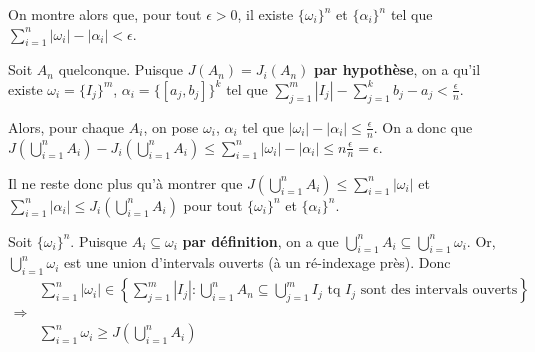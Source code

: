 \documentclass[a4paper,10pt]{article}
\begin{document}
On montre alors que, pour tout $\epsilon > 0$, il existe $\{\omega_i\}^n$ et $\{\alpha_i\}^n$ tel que $\sum_{i=1}^n |\omega_i| - |\alpha_i| < \epsilon$.

Soit $A_n$ quelconque. Puisque $J(A_n) = J_i(A_n)$ \textbf{par hypothèse}, on a qu'il existe $\omega_i = \{I_j\}^m$, $\alpha_i = \{[a_j, b_j]\}^k$ tel que $\sum_{j=1}^m |I_j| - \sum_{j=1}^k b_j - a_j < \frac{\epsilon}{n}$.

Alors, pour chaque $A_i$, on pose $\omega_i$, $\alpha_i$ tel que $|\omega_i| - |\alpha_i| \leq \frac{\epsilon}{n}$. On a donc que $J(\bigcup_{i=1}^n A_i) - J_i(\bigcup_{i=1}^n A_i) \leq \sum_{i=1}^n |\omega_i| - |\alpha_i| \leq n \frac{\epsilon}{n} = \epsilon$.

Il ne reste donc plus qu'à montrer que $J(\bigcup_{i=1}^n A_i) \leq \sum_{i=1}^n |\omega_i|$ et $\sum_{i=1}^n |\alpha_i| \leq J_i (\bigcup_{i=1}^n A_i)$ pour tout $\{\omega_i\}^n$ et $\{\alpha_i\}^n$.

Soit $\{\omega_i\}^n$. Puisque $A_i \subseteq \omega_i$ \textbf{par définition}, on a que $\bigcup_{i=1}^n A_i \subseteq \bigcup_{i=1}^n \omega_i$. Or, $\bigcup_{i=1}^n \omega_i$ est une union d'intervals ouverts (à un ré-indexage près). Donc
\begin{align*}
	& \sum_{i=1}^n |\omega_i| \in \left\{\sum_{j=1}^m |I_j|: \bigcup_{i=1}^n A_n \subseteq \bigcup_{j=1}^m I_j \text{ tq } I_j \text{ sont des intervals ouverts}\right\} \\
	\Rightarrow \\
	& \sum_{i=1}^n \omega_i \geq J\left(\bigcup_{i=1}^n A_i \right)
\end{align*} 

 
\end{document}
